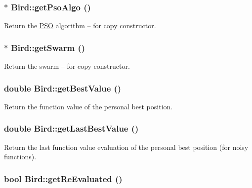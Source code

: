\hypertarget{classBird_858ff60114b075e1d82448826ff3e3ff}{
\subsubsection{$\ast$ Bird::getPsoAlgo ()}}
\label{classBird_858ff60114b075e1d82448826ff3e3ff}


Return the \hyperlink{classPSO}{PSO} algorithm -- for copy constructor. 

\hypertarget{classBird_20d616c42bfb4bcdb2c4517e89c70b0d}{
\subsubsection{$\ast$ Bird::getSwarm ()}}
\label{classBird_20d616c42bfb4bcdb2c4517e89c70b0d}


Return the swarm -- for copy constructor. 

\hypertarget{classBird_9e93d67d4232ccd557f4e4293ebbe8f5}{
\subsubsection{\setlength{\rightskip}{0pt plus 5cm}double Bird::getBestValue ()}}
\label{classBird_9e93d67d4232ccd557f4e4293ebbe8f5}


Return the function value of the personal best position. 

\hypertarget{classBird_76259cf6591db8b1b6fae26836ab835d}{
\subsubsection{\setlength{\rightskip}{0pt plus 5cm}double Bird::getLastBestValue ()}}
\label{classBird_76259cf6591db8b1b6fae26836ab835d}


Return the last function value evaluation of the personal best position (for noisy functions). 

\hypertarget{classBird_de897774aec5007edcfca2c04a2adef1}{
\subsubsection{\setlength{\rightskip}{0pt plus 5cm}bool Bird::getReEvaluated ()}}
\label{classBird_de897774aec5007edcfca2c04a2adef1}


